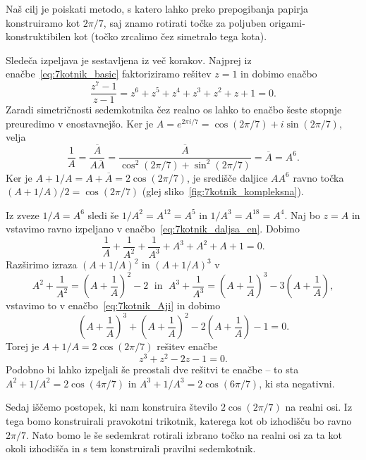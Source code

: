 Naš cilj je poiskati metodo, s katero lahko preko prepogibanja papirja konstruiramo kot $2 \pi / 7$, saj znamo rotirati točke za poljuben origami-konstruktibilen kot (točko zrcalimo čez simetralo tega kota).

Sledeča izpeljava je sestavljena iz več korakov. Najprej iz enačbe~\eqref{eq:7kotnik_basic} faktoriziramo rešitev $z = 1$ in dobimo enačbo
\begin{equation}
    \label{eq:7kotnik_daljsa_en}
    \frac{z^7-1}{z-1}= z^6+z^5+z^4+z^3+z^2+z+1=0.
\end{equation}
Zaradi simetričnosti sedemkotnika čez realno os lahko to enačbo šeste stopnje preuredimo v enostavnejšo. Ker je $A = e^{2 \pi i / 7} = \cos(2 \pi / 7) + i \sin(2 \pi / 7)$, velja
$$ \frac{1}{A} = \frac{\overline{A}}{A \overline{A}} = \frac{\overline{A}}{\cos^2(2 \pi / 7) + \sin^2(2 \pi / 7)} = \overline{A} = A^6.$$
Ker je $A + 1/A = A + \overline{A} = 2 \cos(2 \pi / 7)$, je središče daljice $A A^6$ ravno točka $(A + 1/A)/2 = \cos(2\pi /7)$ (glej sliko~\ref{fig:7kotnik_kompleksna}).

Iz zveze $1/A = A^6$ sledi še $1/A^2 = A^{12} = A^5$ in $1/A^3 = A^{18} = A^4$. Naj bo $z = A$ in vstavimo ravno izpeljano v enačbo~\eqref{eq:7kotnik_daljsa_en}. Dobimo
\begin{equation}
    \label{eq:7kotnik_Aji}
    \frac{1}{A} + \frac{1}{A^2} + \frac{1}{A^3} +A^3+A^2+A+1= 0.
\end{equation}
Razširimo izraza $(A + 1/A)^2$ in $(A + 1/A)^3$ v
$$ A^2 + \frac{1}{A^2} = (A + \frac{1}{A})^2 - 2 \; \text{ in } \; A^3 + \frac{1}{A^3} = (A + \frac{1}{A})^3 - 3(A + \frac{1}{A}),$$
vstavimo to v enačbo~\eqref{eq:7kotnik_Aji} in dobimo
\begin{equation*}
    (A + \frac{1}{A})^3 + (A + \frac{1}{A})^2 - 2(A + \frac{1}{A}) - 1 = 0.
\end{equation*}
Torej je $A + 1/A = 2 \cos(2 \pi / 7)$ rešitev enačbe
\begin{equation}
    \label{eq:7kotnik_kubicna}
    z^3 + z^2 - 2z - 1 = 0.
\end{equation}
Podobno bi lahko izpeljali še preostali dve rešitvi te enačbe -- to sta $A^2 + 1/A^2 = 2\cos (4 \pi / 7)$ in $A^3 + 1/A^3 = 2\cos (6 \pi / 7)$, ki sta negativni.

Sedaj iščemo postopek, ki nam konstruira število $2 \cos(2 \pi / 7)$ na realni osi. Iz tega bomo konstruirali pravokotni trikotnik, katerega kot ob izhodišču bo ravno $2 \pi /7$. Nato bomo le še sedemkrat rotirali izbrano točko na realni osi za ta kot okoli izhodišča in s tem konstruirali pravilni sedemkotnik.

